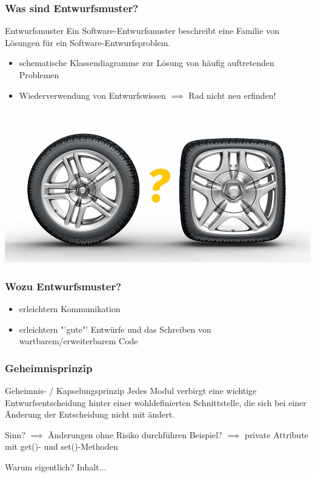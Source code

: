 \documentclass[18pt]{beamer}
\begin{document}
	\begin{frame}
		\frametitle{Was sind Entwurfsmuster?}
		\begin{block}{Entwurfsmuster}
			Ein Software-Entwurfsmuster beschreibt eine
			Familie von Lösungen für ein Software-Entwurfsproblem.
		\end{block}
		\pause
		\begin{itemize}
			\item schematische Klassendiagramme zur Lösung von häufig auftretenden Problemen \pause
			\item Wiederverwendung von Entwurfswissen $\implies$ Rad nicht neu erfinden!
		\end{itemize}
		\pause
		\centering
		\includegraphics[scale=0.2]{./pics/tut3/new-wheel.jpg}
	\end{frame}

	\begin{frame}
		\frametitle{Wozu Entwurfsmuster?}
		\begin{itemize}
			\item erleichtern Kommunikation \pause
			\item erleichtern "'gute"' Entwürfe und das Schreiben von wartbarem/erweiterbarem Code
		\end{itemize}
\end{frame}
	
	\begin{frame}
		\frametitle{Geheimnisprinzip}
		\begin{block}{Geheimnis- / 
				Kapselungsprinzip}
			Jedes Modul verbirgt eine wichtige
			Entwurfsentscheidung hinter einer
			wohldefinierten Schnittstelle, die sich bei einer
			Änderung der Entscheidung nicht mit ändert.
		\end{block}
		\pause
		Sinn? \pause $\implies$ Änderungen ohne Risiko durchführen \linebreak \pause
		Beispiel? \pause $\implies$ private Attribute mit get()- und set()-Methoden
		\begin{alertblock}{Warum eigentlich?}
			Inhalt...
		\end{alertblock}
	\end{frame}
\end{document}
